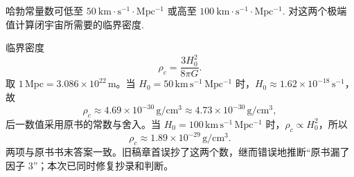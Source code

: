 \begin{exercise}\label{ex:32.5}
哈勃常量数可低至 $50 \ \mathrm{km \cdot s^{-1} \cdot Mpc^{-1}}$ 或高至 $100 \ \mathrm{km \cdot s^{-1} \cdot Mpc^{-1}}$. 对这两个极端值计算闭宇宙所需要的临界密度.
\end{exercise}
\begin{solution}
临界密度
$$
\rho_c=\frac{3H_0^2}{8\pi G}.
$$
取 $1\,\mathrm{Mpc}=3.086\times10^{22}\,\mathrm m$。当 $H_0=50\,\mathrm{km\,s^{-1}\,Mpc^{-1}}$ 时，$H_0\approx1.62\times10^{-18}\,\mathrm{s^{-1}}$，故
$$
\rho_c\approx4.69\times10^{-30}\,\mathrm{g/cm^3}\approx\boxed{4.73\times10^{-30}\,\mathrm{g/cm^3}},
$$
后一数值采用原书的常数与舍入。当 $H_0=100\,\mathrm{km\,s^{-1}\,Mpc^{-1}}$ 时，$\rho_c\propto H_0^2$，所以
$$
\boxed{\rho_c\approx1.89\times10^{-29}\,\mathrm{g/cm^3}}.
$$
两项与原书书末答案一致。旧稿章首误抄了这两个数，继而错误地推断“原书漏了因子 $3$”；本次已同时修复抄录和判断。
\end{solution}

